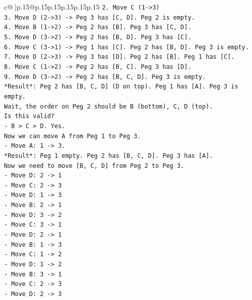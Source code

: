 \documentclass{article}
\begin{document}
{\begin{supertabular}{c@{$\;$}|p{.15\linewidth}@{}p{.15\linewidth}p{.15\linewidth}p{.15\linewidth}p{.15\linewidth}p{.15\linewidth}}
{{{\texttt{2. Move C (1{-}>3)} \\
\texttt{3. Move D (2{-}>3) {-}> Peg 3 has {[}C, D{]}. Peg 2 is empty.} \\
\texttt{4. Move B (1{-}>2) {-}> Peg 2 has {[}B{]}. Peg 3 has {[}C, D{]}.} \\
\texttt{5. Move D (3{-}>2) {-}> Peg 2 has {[}B, D{]}. Peg 3 has {[}C{]}.} \\
\texttt{6. Move C (3{-}>1) {-}> Peg 1 has {[}C{]}. Peg 2 has {[}B, D{]}. Peg 3 is empty.} \\
\texttt{7. Move D (2{-}>3) {-}> Peg 3 has {[}D{]}. Peg 2 has {[}B{]}. Peg 1 has {[}C{]}.} \\
\texttt{8. Move C (1{-}>2) {-}> Peg 2 has {[}B, C{]}. Peg 3 has {[}D{]}.} \\
\texttt{9. Move D (3{-}>2) {-}> Peg 2 has {[}B, C, D{]}. Peg 3 is empty.} \\
\texttt{*Result*: Peg 2 has {[}B, C, D{]} (D on top). Peg 1 has {[}A{]}. Peg 3 is empty.} \\
\texttt{Wait, the order on Peg 2 should be B (bottom), C, D (top).} \\
\texttt{Is this valid?} \\
\texttt{{-} B > C > D. Yes.} \\
\texttt{Now we can move A from Peg 1 to Peg 3.} \\
\texttt{{-} Move A: 1 {-}> 3.} \\
\texttt{*Result*: Peg 1 empty. Peg 2 has {[}B, C, D{]}. Peg 3 has {[}A{]}.} \\
\texttt{Now we need to move {[}B, C, D{]} from Peg 2 to Peg 3.} \\
\texttt{{-} Move D: 2 {-}> 1} \\
\texttt{{-} Move C: 2 {-}> 3} \\
\texttt{{-} Move D: 1 {-}> 3} \\
\texttt{{-} Move B: 2 {-}> 1} \\
\texttt{{-} Move D: 3 {-}> 2} \\
\texttt{{-} Move C: 3 {-}> 1} \\
\texttt{{-} Move D: 2 {-}> 1} \\
\texttt{{-} Move B: 1 {-}> 3} \\
\texttt{{-} Move C: 1 {-}> 2} \\
\texttt{{-} Move D: 1 {-}> 2} \\
\texttt{{-} Move B: 3 {-}> 1} \\
\texttt{{-} Move C: 2 {-}> 3} \\
\texttt{{-} Move D: 2 {-}> 3} \\
}}}
\end{supertabular}}
\end{document}

